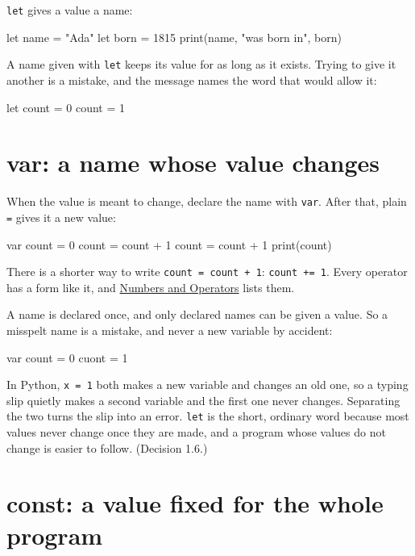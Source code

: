 \verb|let| gives a value a name:

\begin{zeno}
let name = "Ada"
let born = 1815
print(name, "was born in", born)
\end{zeno}

A name given with \verb|let| keeps its value for as long as it exists.
Trying to give it another is a mistake, and the message names the word
that would allow it:

\begin{zeno}[fails=yes]
let count = 0
count = 1
\end{zeno}

\section{var: a name whose value changes}

When the value is meant to change, declare the name with \verb|var|.
After that, plain \verb|=| gives it a new value:

\begin{zeno}
var count = 0
count = count + 1
count = count + 1
print(count)
\end{zeno}

There is a shorter way to write \verb|count = count + 1|:
\verb|count += 1|. Every operator has a form like it, and
\hyperref[ch-numbers]{Numbers and Operators} lists them.

A name is declared once, and only declared names can be given a value.
So a misspelt name is a mistake, and never a new variable by accident:

\begin{zeno}[fails=yes]
var count = 0
cuont = 1
\end{zeno}

\begin{why}
In Python, \verb|x = 1| both makes a new variable and changes an old
one, so a typing slip quietly makes a second variable and the first
one never changes. Separating the two turns the slip into an error.
\verb|let| is the short, ordinary word because most values never
change once they are made, and a program whose values do not change
is easier to follow. (Decision 1.6.)
\end{why}

\section{const: a value fixed for the whole program}

